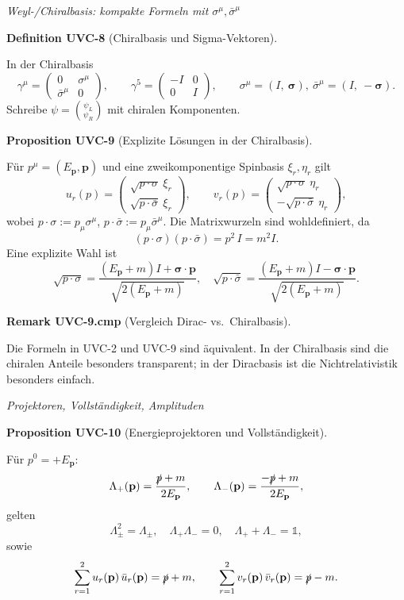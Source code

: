 \documentclass[10pt, letterpaper]{article}
\newcommand{\CustomHeading}[3]{%
  \par\medskip\noindent%
  \textbf{#1 #2} \textnormal{(#3)}.\enskip%
}
\newenvironment{DEF}[2]{\begin{unitbox}\CustomHeading{Definition}{#1}{#2}}{\end{unitbox}}
\newenvironment{PROP}[2]{\begin{unitbox}\CustomHeading{Proposition}{#1}{#2}}{\end{unitbox}}
\newenvironment{REM}[2]{\begin{unitbox}\CustomHeading{Remark}{#1}{#2}}{\end{unitbox}}
\begin{document}
\emph{Weyl-/Chiralbasis: kompakte Formeln mit \texorpdfstring{$\sigma^\mu,\bar\sigma^\mu$}{sigma, sigma-bar}}

\begin{DEF}{UVC-8}{Chiralbasis und Sigma-Vektoren}
In der Chiralbasis
\[
\gamma^\mu=\begin{pmatrix}0&\sigma^\mu\\[2pt]\bar\sigma^\mu&0\end{pmatrix},\qquad
\gamma^5=\begin{pmatrix}-I&0\\[2pt]0&I\end{pmatrix},\qquad
\sigma^\mu=(I,\ \boldsymbol\sigma),\ \bar\sigma^\mu=(I,\ -\boldsymbol\sigma).
\]
Schreibe $\psi=\binom{\psi_L}{\psi_R}$ mit chiralen Komponenten.
\end{DEF}

\begin{PROP}{UVC-9}{Explizite Lösungen in der Chiralbasis}
Für $p^\mu=(E_{\mathbf p},\mathbf p)$ und eine zweikomponentige Spinbasis $\xi_r,\eta_r$ gilt
\[
u_r(p)=\begin{pmatrix}
\sqrt{p\!\cdot\!\sigma}\ \xi_r\\[6pt]
\sqrt{p\!\cdot\!\bar\sigma}\ \xi_r
\end{pmatrix},\qquad
v_r(p)=\begin{pmatrix}
\sqrt{p\!\cdot\!\sigma}\ \eta_r\\[6pt]
-\sqrt{p\!\cdot\!\bar\sigma}\ \eta_r
\end{pmatrix},
\]
wobei $p\!\cdot\!\sigma:=p_\mu\sigma^\mu$, $p\!\cdot\!\bar\sigma:=p_\mu\bar\sigma^\mu$. Die Matrixwurzeln sind wohldefiniert, da
\[
(p\!\cdot\!\sigma)(p\!\cdot\!\bar\sigma)=p^2\,I=m^2 I.
\]
Eine explizite Wahl ist
\[
\sqrt{p\!\cdot\!\sigma}=\frac{(E_{\mathbf p}+m)I+\boldsymbol\sigma\!\cdot\!\mathbf p}{\sqrt{2(E_{\mathbf p}+m)}},\quad
\sqrt{p\!\cdot\!\bar\sigma}=\frac{(E_{\mathbf p}+m)I-\boldsymbol\sigma\!\cdot\!\mathbf p}{\sqrt{2(E_{\mathbf p}+m)}}.
\]
\end{PROP}

\begin{REM}{UVC-9.cmp}{Vergleich Dirac- vs.\ Chiralbasis}
Die Formeln in \textsc{UVC-2} und \textsc{UVC-9} sind äquivalent. In der Chiralbasis sind die chiralen Anteile besonders transparent; in der Diracbasis ist die Nichtrelativistik besonders einfach.
\end{REM}

\emph{Projektoren, Vollständigkeit, Amplituden}

\begin{PROP}{UVC-10}{Energieprojektoren und Vollständigkeit}
Für $p^0=+E_{\mathbf p}$:
\[
\Lambda_+(\mathbf p)=\frac{\slashed p+m}{2E_{\mathbf p}},\qquad
\Lambda_-(\mathbf p)=\frac{-\slashed p+m}{2E_{\mathbf p}},
\]
gelten
\[
\Lambda_\pm^2=\Lambda_\pm,\quad \Lambda_+\Lambda_-=0,\quad \Lambda_++\Lambda_-=\mathbb 1,
\]
sowie
\[
\sum_{r=1}^2 u_r(\mathbf p)\,\bar u_r(\mathbf p)=\slashed p+m,\qquad
\sum_{r=1}^2 v_r(\mathbf p)\,\bar v_r(\mathbf p)=\slashed p-m.
\]
\end{PROP}
\end{document}
